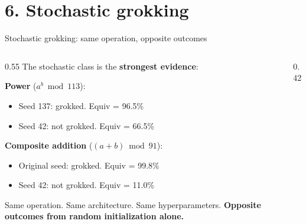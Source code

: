 \documentclass[aspectratio=169,11pt]{beamer}
\begin{document}
\section{6. Stochastic grokking}

\begin{frame}{Stochastic grokking: same operation, opposite outcomes}

\begin{columns}[T]
\begin{column}{0.55\textwidth}
{\small The stochastic class is the \textbf{strongest evidence}:}

\vspace{0.3em}
{\small \textbf{Power} ($a^b \bmod 113$):}
\begin{itemize}
  \item {\small Seed 137: grokked. Equiv = 96.5\%}
  \item {\small Seed 42: not grokked. Equiv = 66.5\%}
\end{itemize}

\vspace{0.3em}
{\small \textbf{Composite addition} ($(a+b) \bmod 91$):}
\begin{itemize}
  \item {\small Original seed: grokked. Equiv = 99.8\%}
  \item {\small Seed 42: not grokked. Equiv = 11.0\%}
\end{itemize}

\vspace{0.3em}
{\small Same operation. Same architecture. Same hyperparameters. \textbf{Opposite outcomes from random initialization alone.}}

\vspace{0.3em}
\end{column}
\begin{column}{0.42\textwidth}
\end{column}
\end{columns}
\end{frame}
\end{document}
